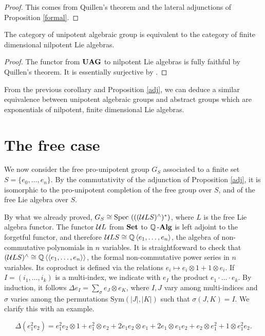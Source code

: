 \begin{proof}
This comes from Quillen's theorem and the lateral adjunctions of Proposition \ref{formal}.
\end{proof}

\begin{cor}
The category of unipotent algebraic group is equivalent to the category of finite dimensional nilpotent Lie algebras.
\end{cor}

\begin{proof}
The functor from $\operatorname{\bf{UAG}}$ to nilpotent Lie algebras is fully faithful by Quillen's theorem. It is essentially surjective by \cite[Theorem 3.27]{milne-ag}.
\end{proof}

From the previous corollary and Proposition \ref{adj}, we can deduce a similar equivalence between unipotent algebraic groups and abstract groups which are exponentials of nilpotent, finite dimensional Lie algebras.

\section{The free case}

We now consider the free pro-unipotent group $G_S$ associated to a finite set $S=\{e_0,\ldots,e_n\}$. By the commutativity of the adjunction of Proposition \ref{adj}, it is isomorphic to the pro-unipotent completion of the free group over $S$, and of the free Lie algebra over $S$.

By what we already proved, $G_S\cong\mathrm{Spec}~(((\mathcal{U} LS)^\wedge)^*)$, where $L$ is the free Lie algebra functor. The functor $\mathcal{U} L$ from $\operatorname{\bf{Set}}$ to $\mathbb{Q}\operatorname{\bf{-Alg}}$ is left adjoint to the forgetful functor, and therefore $\mathcal{U} LS\cong\mathbb{Q}\left\langle e_1,\ldots,e_n\right\rangle$, the algebra of non-commutative polynomials in $n$ variables. It is straightforward to check that $(\mathcal{U} LS)^\wedge\cong\mathbb{Q}\left\langle \left\langle e_1,\ldots,e_n\right\rangle\right\rangle$, the formal non-commutative power series in $n$ variables. Its coproduct is defined via the relations $e_i\mapsto e_i\otimes1+1\otimes e_i$. If $I=(i_1,\ldots,i_k)$ is a multi-index, we indicate with $e_I$ the product $e_1\cdot\ldots\cdot e_k$. By induction, it follows $\Delta e_I=\sum_\sigma e_J\otimes e_K$, where $I,J$ vary among multi-indices and $\sigma$ varies among the permutations $\mathrm{Sym}(|J|,|K|)$ such that $\sigma(J,K)=I$. We clarify this with an example.

\begin{exam}
\[\Delta( e_1^2e_2 )= e_1^2e_2\otimes1+e_1^2\otimes e_2+2e_1 e_2\otimes e_1+2e_1\otimes e_1e_2+e_2\otimes e_1^2+1\otimes e_1^2e_2.\]
\end{exam}

